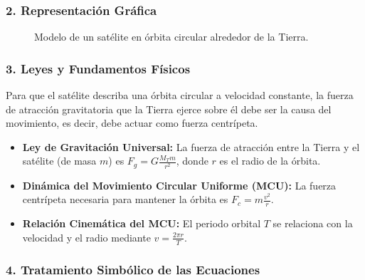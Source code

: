 \subsubsection*{2. Representación Gráfica}
\begin{figure}[H]
    \centering
    \caption{Modelo de un satélite en órbita circular alrededor de la Tierra.}
\end{figure}

\subsubsection*{3. Leyes y Fundamentos Físicos}
Para que el satélite describa una órbita circular a velocidad constante, la fuerza de atracción gravitatoria que la Tierra ejerce sobre él debe ser la causa del movimiento, es decir, debe actuar como fuerza centrípeta.
\begin{itemize}
    \item \textbf{Ley de Gravitación Universal:} La fuerza de atracción entre la Tierra y el satélite (de masa $m$) es $F_g = G \frac{M_T m}{r^2}$, donde $r$ es el radio de la órbita.
    \item \textbf{Dinámica del Movimiento Circular Uniforme (MCU):} La fuerza centrípeta necesaria para mantener la órbita es $F_c = m \frac{v^2}{r}$.
    \item \textbf{Relación Cinemática del MCU:} El periodo orbital $T$ se relaciona con la velocidad y el radio mediante $v = \frac{2\pi r}{T}$.
\end{itemize}

\subsubsection*{4. Tratamiento Simbólico de las Ecuaciones}
